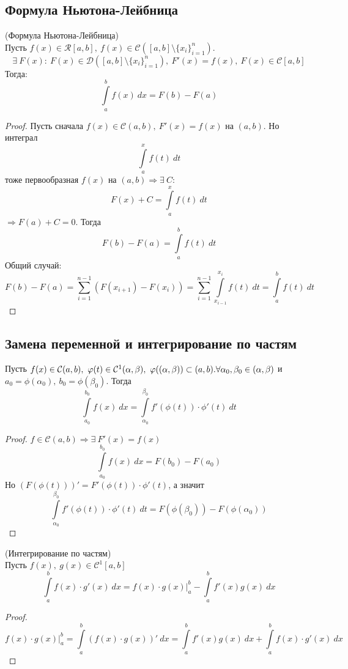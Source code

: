 \subsection{Формула Ньютона-Лейбница}
\begin{theorem} (Формула Ньютона-Лейбница)\\
    Пусть $f(x)\in \mathcal{R}[a,b],\ f(x)\in \mathcal{C}([a,b]\setminus \{x_i\}_{i=1}^{n})$.
    \[\exists\ F(x): \ F(x)\in \mathcal{D}([a,b]\setminus \{x_i\}_{i=1}^{n}),\ F'(x)=f(x),\ F(x)\in \mathcal{C}[a,b]\] 
    Тогда: 
    \[\int\limits_{a}^{b}f(x)\ dx=F(b)-F(a)\]
\end{theorem} 
\begin{proof}
    Пусть сначала $f(x)\in \mathcal{C}(a,b),\ F'(x)=f(x)$ на $(a,b)$. Но интеграл
    \[\int\limits_{a}^{x}f(t)\ dt\]
    тоже первообразная $f(x)$ на $(a,b) \Rightarrow \exists\ C:$
    \[F(x)+C=\int\limits_{a}^{x}f(t)\ dt\]
    $\Rightarrow F(a)+C=0$. Тогда 
    \[F(b)-F(a)=\int\limits_{a}^{b} f(t)\ dt\]
    Общий случай:
        \[F(b)-F(a)=\sum\limits_{i=1}^{n-1}(F(x_{i+1})-F(x_{i}))=\sum\limits_{i=1}^{n-1} \int\limits_{x_{i-1}}^{x_i} f(t)\ dt=\int\limits_{a}^{b} f(t)\ dt\]
\end{proof} 
\subsection{Замена переменной и интегрирование по частям}
\begin{theorem}
    Пусть $f(x)\in \mathcal{C}(a,b),\ \phi(t)\in \mathcal{C}^1(\alpha, \beta),\ \phi((\alpha, \beta))\subset (a,b).\\
    \forall \alpha_0, \beta_0\in (\alpha, \beta)$ и $a_0=\phi(\alpha_0),\ b_0=\phi(\beta_0)$. Тогда
    \[\int\limits_{a_0}^{b_0}f(x)\ dx=\int\limits_{\alpha_0}^{\beta_0}f'(\phi(t))\cdot \phi'(t)\ dt\]
\end{theorem} 
\begin{proof}
    $f\in \mathcal{C}(a,b) \Rightarrow \exists\ F'(x)=f(x)$
    \[\int\limits_{a_0}^{b_0}f(x)\ dx= F(b_0)-F(a_0)\]
    Но $(F(\phi(t)))'=F'(\phi(t))\cdot \phi'(t)$, а значит
    \[\int\limits_{\alpha_0}^{\beta_0}f'(\phi(t))\cdot\phi'(t)\ dt=F(\phi(\beta_0))-F(\phi(\alpha_0))\]
\end{proof} 
\begin{theorem} (Интегрирование по частям)\\
    Пусть $f(x),\ g(x)\in \mathcal{C}^1[a,b]$
    \[\int\limits_{a}^{b}f(x)\cdot g'(x)\ dx=f(x)\cdot g(x)|_a^b-\int\limits_{a}^{b}f'(x)g(x)\ dx\]
\end{theorem} 
\begin{proof}
    \[f(x)\cdot g(x)|_a^b=\int\limits_{a}^{b}(f(x)\cdot g(x))'\ dx=\int\limits_{a}^{b}f'(x)g(x)\ dx+\int\limits_{a}^{b}f(x)\cdot g'(x)\ dx\]
\end{proof} 
\newpage
